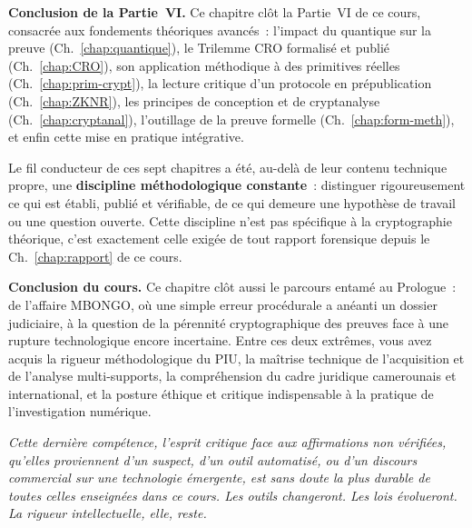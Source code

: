 \bigskip

\begin{boxinfo}
\textbf{Conclusion de la Partie~VI.} Ce chapitre clôt la Partie~VI
de ce cours, consacrée aux fondements théoriques avancés~: l'impact
du quantique sur la preuve (Ch.~\ref{chap:quantique}), le Trilemme
CRO formalisé et publié (Ch.~\ref{chap:CRO}), son application
méthodique à des primitives réelles (Ch.~\ref{chap:prim-crypt}),
la lecture critique d'un protocole en prépublication
(Ch.~\ref{chap:ZKNR}), les principes de conception et de
cryptanalyse (Ch.~\ref{chap:cryptanal}), l'outillage de la preuve
formelle (Ch.~\ref{chap:form-meth}), et enfin cette mise en pratique
intégrative.

Le fil conducteur de ces sept chapitres a été, au-delà de leur
contenu technique propre, une \textbf{discipline méthodologique
constante}~: distinguer rigoureusement ce qui est établi, publié et
vérifiable, de ce qui demeure une hypothèse de travail ou une
question ouverte. Cette discipline n'est pas spécifique à la
cryptographie théorique, c'est exactement celle exigée de tout
rapport forensique depuis le Ch.~\ref{chap:rapport} de ce cours.

\medskip
\textbf{Conclusion du cours.} Ce chapitre clôt aussi le parcours
entamé au Prologue~: de l'affaire MBONGO, où une simple erreur
procédurale a anéanti un dossier judiciaire, à la question de la
pérennité cryptographique des preuves face à une rupture
technologique encore incertaine. Entre ces deux extrêmes, vous
avez acquis la rigueur méthodologique du PIU, la maîtrise
technique de l'acquisition et de l'analyse multi-supports, la
compréhension du cadre juridique camerounais et international,
et la posture éthique et critique indispensable à la pratique
de l'investigation numérique.

\textit{Cette dernière compétence, l'esprit critique face aux
affirmations non vérifiées, qu'elles proviennent d'un suspect,
d'un outil automatisé, ou d'un discours commercial sur une
technologie émergente, est sans doute la plus durable de
toutes celles enseignées dans ce cours. Les outils changeront.
Les lois évolueront. La rigueur intellectuelle, elle, reste.}
\end{boxinfo}